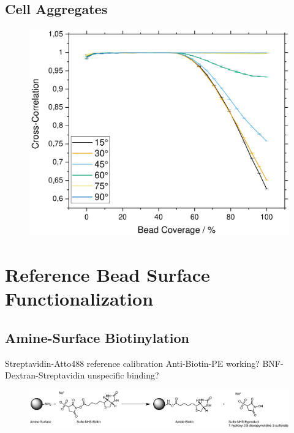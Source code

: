 \subsection{Cell Aggregates}

\begin{figure}
	\centering
	\includegraphics[width=.7\linewidth]{Ressources/Simulation/Aggregates}
\end{figure}

\section{Reference Bead Surface Functionalization}

\subsection{Amine-Surface Biotinylation}
Streptavidin-Atto488 reference calibration
Anti-Biotin-PE working?
BNF-Dextran-Streptavidin unspecific binding?



\begin{figure}[htb!]
	\centering
	\includegraphics[width=\textwidth]{./Ressources/Chemistry/Sulfo-NHS.eps}
	\label{fig:Chem:NH2-NHS}
\end{figure}





